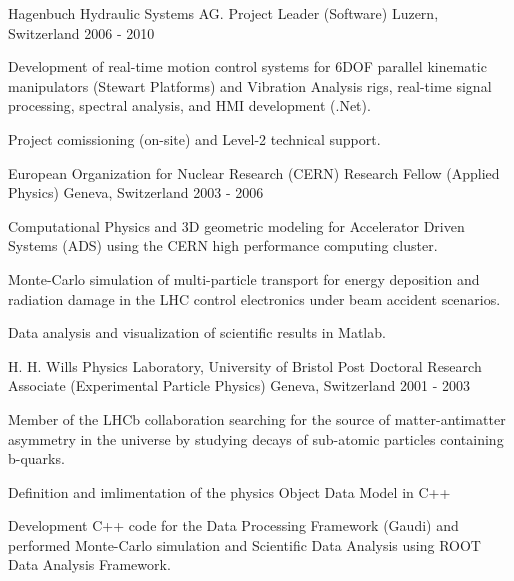 \begin{cventries}
\cventry
{Hagenbuch Hydraulic Systems AG.} %
{Project Leader (Software)} %
{Luzern, Switzerland} %
{2006 - 2010} %
{
  \begin{cvitems} %
    \item {
        Development of real-time motion control systems for 6DOF parallel 
        kinematic manipulators (Stewart Platforms) and Vibration Analysis rigs,
        real-time signal processing, spectral analysis, and HMI development (.Net).}
    \item {
        Project comissioning (on-site) and Level-2 technical support.}
  \end{cvitems}
}

\cventry
{European Organization for Nuclear Research (CERN)} %
{Research Fellow (Applied Physics)} %
{Geneva, Switzerland} %
{2003 - 2006} %
{
  \begin{cvitems} %
    \item {
        Computational Physics and 3D geometric modeling for Accelerator Driven Systems (ADS) using the CERN 
        high performance computing cluster.}
    \item {
        Monte-Carlo simulation of multi-particle transport for energy deposition 
        and radiation damage in the LHC control electronics under 
        beam accident scenarios.} 
        \item{
        Data analysis and visualization of scientific results in Matlab.}
  \end{cvitems}
}

\cventry
{H. H. Wills Physics Laboratory, University of Bristol} %
{Post Doctoral Research Associate (Experimental Particle Physics)} %
{Geneva, Switzerland} %
{2001 - 2003} %
{
  \begin{cvitems} %
    \item {
        Member of the LHCb collaboration searching for the source of matter-antimatter 
        asymmetry in the universe by studying decays of sub-atomic particles containing b-quarks.}
    \item {
        Definition and imlimentation of the physics Object Data Model in C++}
    \item {
        Development C++ code 
        for the Data Processing Framework (Gaudi) and performed Monte-Carlo simulation
        and Scientific Data Analysis using ROOT Data Analysis Framework.}
  \end{cvitems}
}


\end{cventries}
